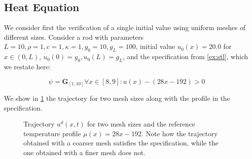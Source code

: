 \documentclass[letterpaper, 10 pt, conference]{ieeeconf/ieeeconf}
\newcommand{\Always}{\mathbf{G}}
\begin{document}
\subsection{Heat Equation}
\label{sub:heat_equation}

We consider first the verification of a single initial value using uniform
meshes of different sizes. Consider a rod with parameters $L = 10, \rho = 1, c =
1, \kappa = 1, g_0 = 10, g_L = 100$, initial value $u_0(x) = 20.0$
for $x \in (0, L)$, $u_0(0) = g_0, u_0(L) = g_L$, and the specification from
\cref{ex:stl}, which we restate here:

\begin{equation}
    \psi = \Always_{[1,10]} \forall x \in [8,9] : u(x) - (28x - 192) > 0
\end{equation}

We show in \cref{fig:ex1_evolution} the trajectory for two mesh sizes along with the
profile in the specification.

\begin{figure}[!t]
    \centering 
        \hfill
        \hfill
    \caption{Trajectory $u^d(x, t)$ for two mesh sizes and the reference
        temperature profile $\mu(x) = 28x - 192$. Note how the trajectory
        obtained with a coarser mesh satisfies the specification, while the one
        obtained with a finer mesh does not.}
    \label{fig:ex1_evolution}
\end{figure}
\end{document}
